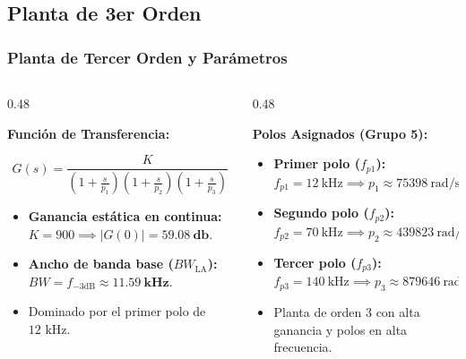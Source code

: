 \documentclass[aspectratio=169, 10pt]{beamer}
\begin{document}
\subsection{Planta de 3er Orden}
\begin{frame}
  \frametitle{Planta de Tercer Orden y Parámetros}

  \begin{columns}[t, onlytextwidth]
    \begin{column}{0.48\textwidth}
      \begin{tarjeta}
        {\fontsize{9pt}{11pt}\selectfont \textbf{\color{NavyDark} Función de Transferencia:}}\\[2pt]
        {\fontsize{8pt}{10pt}\selectfont
        \[ G(s) = \frac{K}{\left(1 + \frac{s}{p_1}\right)\left(1 + \frac{s}{p_2}\right)\left(1 + \frac{s}{p_3}\right)} \]
        \begin{itemize}\setlength{\itemsep}{2.5pt}
          \item \textbf{Ganancia estática en continua:}
          $K = 900 \implies |G(0)| = \mathbf{\qty{59.08}{\decibel}}$.
          \item \textbf{Ancho de banda base ($BW_{\text{LA}}$):}
          $BW = f_{-3\text{dB}} \approx \mathbf{\qty{11.59}{\kilo\hertz}}$.
          \item Dominado por el primer polo de $12\text{ kHz}$.
        \end{itemize}
        }
      \end{tarjeta}
    \end{column}

    \begin{column}{0.48\textwidth}
      \begin{tarjeta}
        {\fontsize{9pt}{11pt}\selectfont \textbf{\color{NavyDark} Polos Asignados (Grupo 5):}}\\[2pt]
        {\fontsize{8pt}{10pt}\selectfont
        \begin{itemize}\setlength{\itemsep}{3pt}
          \item \textbf{Primer polo ($f_{p1}$):}
          $f_{p1} = \qty{12}{\kilo\hertz} \implies p_1 \approx \qty{75398}{\radian\per\second}$
          \item \textbf{Segundo polo ($f_{p2}$):}
          $f_{p2} = \qty{70}{\kilo\hertz} \implies p_2 \approx \qty{439823}{\radian\per\second}$
          \item \textbf{Tercer polo ($f_{p3}$):}
          $f_{p3} = \qty{140}{\kilo\hertz} \implies p_3 \approx \qty{879646}{\radian\per\second}$
          \item Planta de orden 3 con alta ganancia y polos en alta frecuencia.
        \end{itemize}
        }
      \end{tarjeta}
    \end{column}
  \end{columns}
\end{frame}
\end{document}
